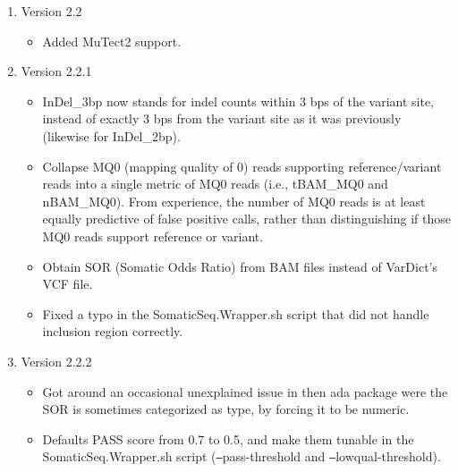 \documentclass[10pt,letterpaper]{article}
\begin{document}
\begin{sloppypar}
\begin{enumerate}
	
	
	\item Version 2.2
	
		\begin{itemize}
		
		  \item
		  Added MuTect2 support.
		
		\end{itemize}
	
	
	
	\item Version 2.2.1
	
		\begin{itemize}
		
		  \item
		  InDel\_3bp now stands for indel counts within 3 bps of the variant site, instead of exactly 3 bps from the variant site as it was previously (likewise for InDel\_2bp). 
		 
		  \item
		  Collapse MQ0 (mapping quality of 0) reads supporting reference/variant reads into a single metric of MQ0 reads (i.e., tBAM\_MQ0 and nBAM\_MQ0). From experience, the number of MQ0 reads is at least equally predictive of false positive calls, rather than distinguishing if those MQ0 reads support reference or variant. 
		  
		  \item
		  Obtain SOR (Somatic Odds Ratio) from BAM files instead of VarDict's VCF file.
		  
		  \item
		  Fixed a typo in the SomaticSeq.Wrapper.sh script that did not handle inclusion region correctly.
		  
		\end{itemize}
	
	
	
	\item Version 2.2.2
	
		\begin{itemize}
		
		  \item
		  Got around an occasional unexplained issue in then ada package were the SOR is sometimes categorized as type, by forcing it to be numeric. 
		  
		  \item
		  Defaults PASS score from 0.7 to 0.5, and make them tunable in the SomaticSeq.Wrapper.sh script (\texttt{--}pass-threshold and \texttt{--}lowqual-threshold). 
		  

\end{itemize}
\end{enumerate}
\end{sloppypar}
\end{document}
